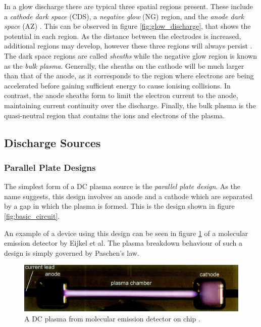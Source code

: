 In a glow discharge there are typical three spatial regions present. These include a \textit{cathode dark space} (CDS), a \textit{negative glow} (NG) region, and the \textit{anode dark space} (AZ) \cite{Gudmundsson2017, Bogaerts2002}. This can be observed in figure \ref{fig:glow_discharge}, that shows the potential in each region. As the distance between the electrodes is increased, additional regions may develop, however these three regions will always persist \cite{Gudmundsson2017}. The dark space regions are called \textit{sheaths} while the negative glow region is known as the \textit{bulk plasma}. Generally, the sheaths on the cathode will be much larger than that of the anode, as it corresponds to the region where electrons are being accelerated before gaining sufficient energy to cause ionising collisions. In contrast, the anode sheaths form to limit the electron current to the anode, maintaining current continuity over the discharge. Finally, the bulk plasma is the quasi-neutral region that contains the ions and electrons of the plasma.

\subsection{Discharge Sources}
\subsubsection{Parallel Plate Designs}

The simplest form of a DC plasma source is the \textit{parallel plate design}. As the name suggests, this design involves an anode and a cathode which are separated by a gap in which the plasma is formed. This is the design shown in figure \ref{fig:basic_circuit}.

An example of a device using this design can be seen in figure \ref{fig:parallel_plate_design} of a molecular emission detector by Eijkel et al\cite{Eijkel1999}. The plasma breakdown behaviour of such a design is simply governed by Paschen's law. 

\begin{figure}[h!]
	\centering
	\includegraphics[width=\linewidth]{chapter_2/figures/parallel_plate.jpeg}
	\caption{A DC plasma from molecular emission detector on chip \cite{Eijkel1999}.}
	\label{fig:parallel_plate_design}
\end{figure}

